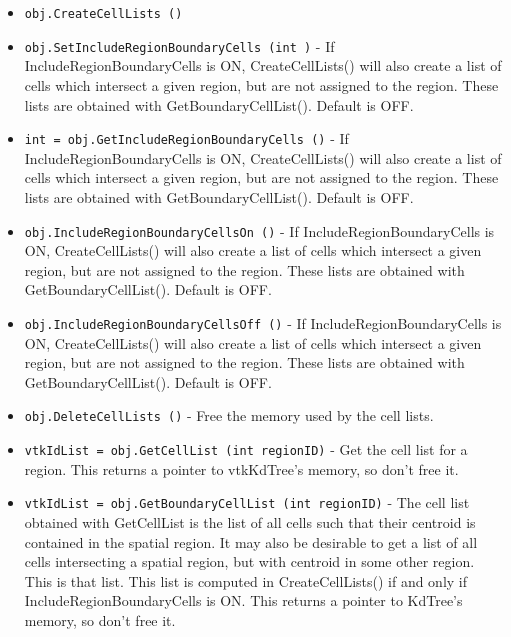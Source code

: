 \begin{itemize}
\item  \verb|obj.CreateCellLists ()|

\item  \verb|obj.SetIncludeRegionBoundaryCells (int )| -    If IncludeRegionBoundaryCells is ON,
   CreateCellLists() will also create a list of cells which
   intersect a given region, but are not assigned
   to the region.  These lists are obtained with 
   GetBoundaryCellList().  Default is OFF.

\item  \verb|int = obj.GetIncludeRegionBoundaryCells ()| -    If IncludeRegionBoundaryCells is ON,
   CreateCellLists() will also create a list of cells which
   intersect a given region, but are not assigned
   to the region.  These lists are obtained with 
   GetBoundaryCellList().  Default is OFF.

\item  \verb|obj.IncludeRegionBoundaryCellsOn ()| -    If IncludeRegionBoundaryCells is ON,
   CreateCellLists() will also create a list of cells which
   intersect a given region, but are not assigned
   to the region.  These lists are obtained with 
   GetBoundaryCellList().  Default is OFF.

\item  \verb|obj.IncludeRegionBoundaryCellsOff ()| -    If IncludeRegionBoundaryCells is ON,
   CreateCellLists() will also create a list of cells which
   intersect a given region, but are not assigned
   to the region.  These lists are obtained with 
   GetBoundaryCellList().  Default is OFF.

\item  \verb|obj.DeleteCellLists ()| -     Free the memory used by the cell lists.

\item  \verb|vtkIdList = obj.GetCellList (int regionID)| -     Get the cell list for a region.  This returns a pointer
    to vtkKdTree's memory, so don't free it.

\item  \verb|vtkIdList = obj.GetBoundaryCellList (int regionID)| -     The cell list obtained with GetCellList is the list
    of all cells such that their centroid is contained in
    the spatial region.  It may also be desirable to get
    a list of all cells intersecting a spatial region,
    but with centroid in some other region.  This is that
    list.  This list is computed in CreateCellLists() if
    and only if IncludeRegionBoundaryCells is ON.  This
    returns a pointer to KdTree's memory, so don't free it.


\end{itemize}
